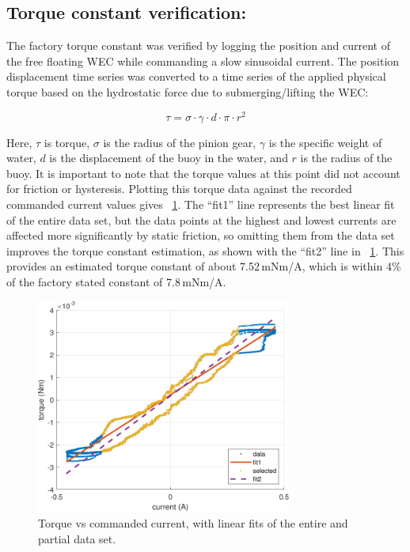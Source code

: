 \documentclass[hardware,article,submit,pdftex,moreauthors]{Definitions/mdpi}
\begin{document}
\subsection{Torque constant verification:}\label{tConstSec}
The factory torque constant was verified by logging the position and current of the free floating WEC while commanding a slow sinusoidal current.
The position displacement time series was converted to a time series of the applied physical torque based on the hydrostatic force due to submerging/lifting the WEC:

\begin{equation}
  \tau = \sigma \cdot \gamma \cdot d \cdot \pi \cdot r^2
\end{equation}

\noindent{}Here, $\tau$ is torque, $\sigma$ is the radius of the pinion gear, $\gamma$ is the specific weight of water, $d$ is the displacement of the buoy in the water, and $r$ is the radius of the buoy.
It is important to note that the torque values at this point did not account for friction or hysteresis.
Plotting this torque data against the recorded commanded current values gives  \figurename~\ref{fig:TorqueConstant}.
The ``fit1'' line represents the best linear fit of the entire data set, but the data points at the highest and lowest currents are affected more significantly by static friction, so omitting them from the data set improves the torque constant estimation, as shown with the ``fit2'' line in \figurename~\ref{fig:TorqueConstant}.
This provides an estimated torque constant of about 7.52\,mNm/A, which is within 4\% of the factory stated constant of 7.8\,mNm/A.

\begin{figure}[tb]
  \centering
  \includegraphics[width=0.75\textwidth]{diagrams/TorqueConstant.pdf}
  \caption{Torque vs commanded current, with linear fits of the entire and partial data set.}
  \label{fig:TorqueConstant}
\end{figure}
\end{document}
